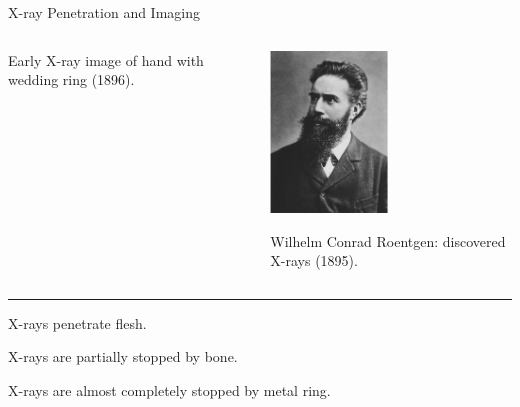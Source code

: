 \begin{slide}{X-ray Penetration and Imaging}
\begin{cenpage}{150mm}
\begin{columns}
\begin{column}{75mm}
{\begin{columns}
\begin{column}{35mm}
               {\small {
                   \vmm
                   Early X-ray image of hand with wedding ring (1896).
                 }}
               
             \end{column}
             \begin{column}{35mm}            
               \includegraphics[height=43mm]{figs/images/Roentgen}
               
               {\small {
                   \vmm
                   Wilhelm Conrad Roentgen: discovered X-rays (1895).
                 }}
               
             \end{column}          
           \end{columns}
      
         \vmm \hrule \vmm \vmm

         X-rays  penetrate flesh.
         
         X-rays are partially stopped by bone.
         
         X-rays are almost completely stopped by metal ring.
         }
         
       \end{column}          
     \end{columns}


\vspace{10mm} \vfill

\end{cenpage}
\end{slide}

